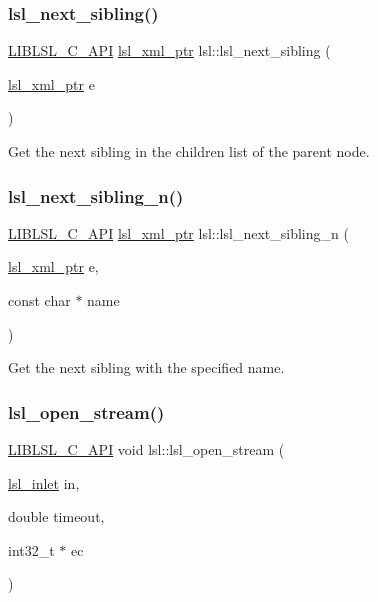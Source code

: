 \subsubsection{\texorpdfstring{lsl\+\_\+next\+\_\+sibling()}{lsl\_next\_sibling()}}
{\footnotesize\ttfamily \hyperlink{lsl__cpp_8h_aafd0ef1813e8be84a1420c4f1df64615}{L\+I\+B\+L\+S\+L\+\_\+\+C\+\_\+\+A\+PI} \hyperlink{namespacelsl_a5edc7a49a1a1be1634fe6dce3d59c59b}{lsl\+\_\+xml\+\_\+ptr} lsl\+::lsl\+\_\+next\+\_\+sibling (\begin{DoxyParamCaption}\item[{\hyperlink{namespacelsl_a5edc7a49a1a1be1634fe6dce3d59c59b}{lsl\+\_\+xml\+\_\+ptr}}]{e }\end{DoxyParamCaption})}

Get the next sibling in the children list of the parent node. \mbox{\label{namespacelsl_ac898e643d9e43785030c3e1a7524ea70}} 
\subsubsection{\texorpdfstring{lsl\+\_\+next\+\_\+sibling\+\_\+n()}{lsl\_next\_sibling\_n()}}
{\footnotesize\ttfamily \hyperlink{lsl__cpp_8h_aafd0ef1813e8be84a1420c4f1df64615}{L\+I\+B\+L\+S\+L\+\_\+\+C\+\_\+\+A\+PI} \hyperlink{namespacelsl_a5edc7a49a1a1be1634fe6dce3d59c59b}{lsl\+\_\+xml\+\_\+ptr} lsl\+::lsl\+\_\+next\+\_\+sibling\+\_\+n (\begin{DoxyParamCaption}\item[{\hyperlink{namespacelsl_a5edc7a49a1a1be1634fe6dce3d59c59b}{lsl\+\_\+xml\+\_\+ptr}}]{e,  }\item[{const char $\ast$}]{name }\end{DoxyParamCaption})}

Get the next sibling with the specified name. \mbox{\label{namespacelsl_ad72aa9d01ea937b413adf615322ce9a7}} 
\subsubsection{\texorpdfstring{lsl\+\_\+open\+\_\+stream()}{lsl\_open\_stream()}}
{\footnotesize\ttfamily \hyperlink{lsl__cpp_8h_aafd0ef1813e8be84a1420c4f1df64615}{L\+I\+B\+L\+S\+L\+\_\+\+C\+\_\+\+A\+PI} void lsl\+::lsl\+\_\+open\+\_\+stream (\begin{DoxyParamCaption}\item[{\hyperlink{namespacelsl_a884a3363cfcba75d7ce8f00c1c4c54f1}{lsl\+\_\+inlet}}]{in,  }\item[{double}]{timeout,  }\item[{int32\+\_\+t $\ast$}]{ec }\end{DoxyParamCaption})}

